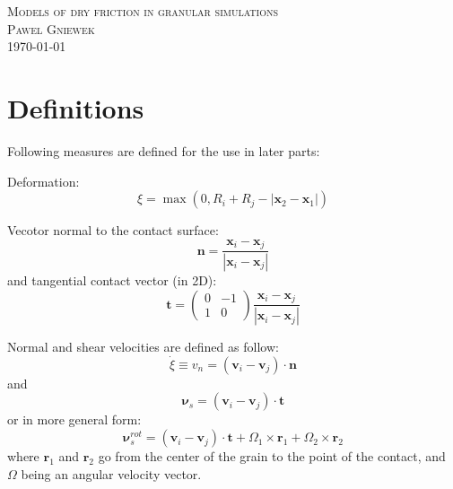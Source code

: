 \documentclass[10pt,a4paper]{article}
\begin{document}
\begin{center}
\textsc{\Large Models of dry friction in granular simulations}\\[1.0cm]
\textsc{\LARGE Pawel Gniewek}\\[1.0cm]
\vspace{0.5cm}
\today

\end{center}

\newpage

\section{Definitions}
Following measures are defined for the use in later parts:

Deformation:
\begin{equation}
 \xi = \max(0, R_i + R_j - |\mathbf{x}_2 - \mathbf{x}_1|)
\end{equation}

Vecotor normal to the contact surface:
\begin{equation}
 \mathbf{n} = \frac{\mathbf{x}_{i} - \mathbf{x}_j}{|\mathbf{x}_{i} - \mathbf{x}_j|}
\end{equation}
and tangential contact vector (in 2D):
\begin{equation}
 \mathbf{t} = \begin{pmatrix} 0 & -1 \\ 1 & 0 \end{pmatrix} \frac{\mathbf{x}_{i} - \mathbf{x}_j}{|\mathbf{x}_{i} - \mathbf{x}_j|}
\end{equation}


Normal and shear velocities are defined as follow:
\begin{equation}
 \dot{\xi} \equiv v_n = (\mathbf{v}_i - \mathbf{v}_j) \cdot \mathbf{n}
\end{equation}
and
\begin{equation} \label{eq:vs1}
 \mathbf{\nu}_s = (\mathbf{v}_i - \mathbf{v}_j) \cdot \mathbf{t}
\end{equation}
or in more general form:
\begin{equation}  \label{eq:vs2}
 \mathbf{\nu}^{rot}_s = (\mathbf{v}_i - \mathbf{v}_j) \cdot \mathbf{t} + \Omega_1 \times \mathbf{r}_1 + \Omega_2 \times \mathbf{r}_2
\end{equation}
where $\mathbf{r}_1$ and $\mathbf{r}_2$ go from the center of the grain to the point of the contact, and $\Omega$ being an angular velocity vector.
\end{document}
